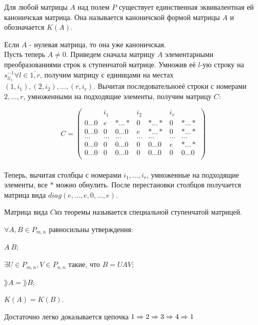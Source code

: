 \begin{proofs}
	Для любой матрицы $A$ над полем $P$ существует единственная эквивалентная ей каноничская матрица.
  Она называется каноничской формой матрицы $A$ и обозначается $K(A)$.
	\begin{dokvo}
    Если $A$ - нулевая матрица, то она уже каноничская.\\
    Пусть теперь $A \neq 0$. Приведем сначала матрицу $A$ элементарными преобразованиями строк к ступенчатой матрице.
    Умножив её $l$-ую строку на $s^{-1}_{li_1} \forall l \in \overline{1, r}$, получим матрицу
    с единицами на местах $(1, i_1), (2, i_2), \ldots, (r, i_r)$. Вычитая последовательноеё строки с номерами $2, \ldots, r$, умноженными
    на подходящие элементы, получим матрицу $C$:


    $$C =
    \begin{pmatrix}
      & i_1 & & i_2 & & i_r & \\
      0\ldots0 & e & *\ldots* & 0 & *\ldots* & 0 & *\ldots* \\
      0\ldots0 & 0 & 0\ldots0 & e & *\ldots* & 0 & *\ldots* \\
      \ldots & \ldots & \ldots & \ldots & \ldots & \ldots & \ldots \\
      0\ldots0 & 0 & 0\ldots0 & 0 & 0\ldots0 & e & *\ldots* \\
      0\ldots0 & 0 & 0\ldots0 & 0 & 0\ldots0 & 0 & 0\ldots0 \\
    \end{pmatrix}$$\\

    Теперь, вычитая столбцы с номерами $i_1, \ldots, i_r$, умноженные на подходящие элементы,
    все $*$ можно обнулить. После перестановки столбцов получается матрица вида $diag(e, \ldots, e, 0, \ldots, e)$.
	\end{dokvo}
\end{proofs}

\begin{defs}
	Матрица вида $C$из теоремы называется специальной ступенчатой матрицей.
\end{defs}

\begin{proofs}
	$\forall A,B \in P_{m,n}$ равносильны утверждения:
  \begin{enumerate*}
  	\item $A~B$;
  	\item $\exists U \in P_{m,n}, V \in P_{n,n}$ такие, что $B = UAV$;
    \item $\rang{A} = \rang{B}$;
    \item $K(A) = K(B)$.
  \end{enumerate*}
	\begin{dokvo}
    Достаточно легко доказывается цепочка $1 \Rightarrow 2 \Rightarrow 3 \Rightarrow 4 \Rightarrow 1$
	\end{dokvo}
\end{proofs}
\newpage
